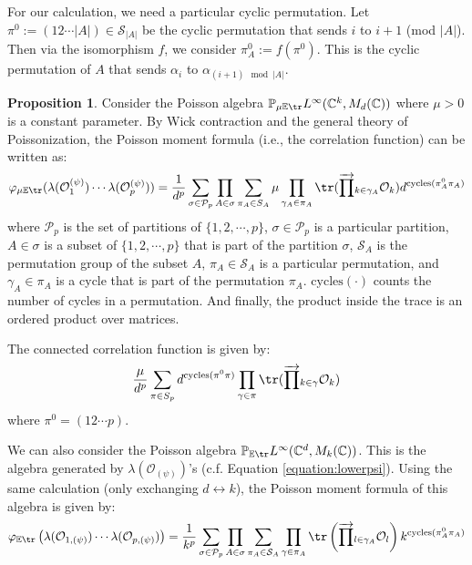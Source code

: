 \documentclass[a4paper,11pt]{article}
\theoremstyle{definition}
\numberwithin{equation}{section}
\newtheorem{proposition}{Proposition}[section]
\newcommand{\lb}{\left(}
\newcommand{\rb}{\right)}
\begin{document}
For our calculation, we need a particular cyclic permutation. Let $\pi^0:=(12\cdots|A|)\in\mathcal{S}_{|A|}$ be the cyclic permutation that sends $i$ to $i + 1$ (mod $|A|$). Then via the isomorphism $f$, we consider $\pi_A^0 := f(\pi^0)$. This is the cyclic permutation of $A$ that sends $\alpha_i$ to $\alpha_{(i + 1)\mod |A|}$.
\begin{proposition}\label{proposition:workhorse}
    Consider the Poisson algebra $\mathbb{P}_{\mu\mathbb{E}\tr}L^\infty(\mathbb{C}^k, M_d(\mathbb{C}))$ where $\mu > 0$ is a constant parameter. By Wick contraction and the general theory of Poissonization, the Poisson moment formula (i.e., the correlation function) can be written as:
    \begin{equation}
        \varphi_{\mu\mathbb{E}\tr}(\lambda(\mathcal{O}_1^{(\psi)})\cdots\lambda(\mathcal{O}^{(\psi)}_p)) = \frac{1}{d^p}\sum_{\sigma\in\mathcal{P}_p}\prod_{A\in\sigma}\sum_{\pi_A\in S_A}\mu \prod_{\gamma_A\in\pi_A}\tr(\overrightarrow{\prod}_{k\in\gamma_A}\mathcal{O}_k)d^{\text{cycles}(\pi_A^0\pi_A)}
    \end{equation}
    where $\mathcal{P}_p$ is the set of partitions of $\{1,2,\cdots,p\}$, $\sigma\in\mathcal{P}_p$ is a particular partition, $A\in\sigma$ is a subset of $\{1,2,\cdots,p\}$ that is part of the partition $\sigma$, $\mathcal{S}_A$ is the permutation group of the subset $A$, $\pi_A\in \mathcal{S}_A$ is a particular permutation, and $\gamma_A\in\pi_A$ is a cycle that is part of the permutation $\pi_A$. $\text{cycles}(\cdot)$ counts the number of cycles in a permutation. And finally, the product inside the trace is an ordered product over matrices.
    
    The connected correlation function is given by:
    \begin{equation}
        \frac{\mu}{d^p}\sum_{\pi\in S_p}d^{\text{cycles}(\pi^0\pi)}\prod_{\gamma\in\pi}\tr(\overrightarrow{\prod}_{k\in\gamma}\mathcal{O}_k)
    \end{equation}
    where $\pi^0 = (12\cdots p)$.
\end{proposition}
We can also consider the Poisson algebra $\mathbb{P}_{\mathbb{E}\tr}L^\infty(\mathbb{C}^d, M_k(\mathbb{C}))$. This is the algebra generated by $\lambda(\mathcal{O}_{(\psi)})$'s (c.f. Equation \ref{equation:lowerpsi}). Using the same calculation (only exchanging $d\leftrightarrow k$), the Poisson moment formula of this algebra is given by:
\begin{equation}\label{equation:momentforJT}
    \varphi_{\mathbb{E}\tr}\lb\lambda(\mathcal{O}_{1,(\psi)})\cdots\lambda(\mathcal{O}_{p,(\psi)})\rb = \frac{1}{k^p}\sum_{\sigma\in\mathcal{P}_p}\prod_{A\in\sigma}\sum_{\pi_A\in\mathcal{S}_A}\prod_{\gamma\in\pi_A}\tr\lb\overrightarrow{\prod}_{l\in \gamma_A}\mathcal{O}_l\rb k^{\text{cycles}(\pi_A^0\pi_A)}
\end{equation}
\end{document}

